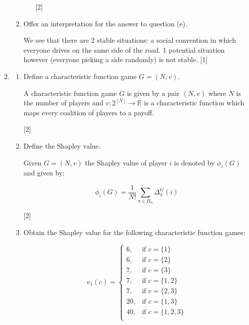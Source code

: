 \documentclass[12pt,a4paper]{article}
\begin{document}
\begin{enumerate}
\begin{enumerate}
\begin{itemize}
                \hfill{[2]}

                \end{itemize}

            \item Offer an interpretation for the answer to question (e).

                We see that there are 2 stable situations: a social convention in which everyone drives on the same side of the road.
                1 potential situation however (everyone picking a side randomly) is not stable.
                \hfill{[1]}
    \end{enumerate}

\newpage
\item


    \begin{enumerate}

        \item Define a characteristic function game \(G=(N,v)\).

        A characteristic function game \(G\) is given by a pair \((N,v)\) where \(N\) is the number of players and \(v:2^{[N]}\to\mathbb{R}\) is a characteristic function which maps every coalition of players to a payoff.

        \hfill{[2]}

        \item Define the Shapley value.

        Given \(G=(N,v)\) the Shapley value of player \(i\) is denoted by \(\phi_i(G)\) and given by:

        $$\phi_i(G)=\frac{1}{N!}\sum_{\pi\in\Pi_n}\Delta_\pi^G(i)$$

        \hfill{[2]}

        \item Obtain the Shapley value for the following characteristic function games:

            \[
                v_1(c) = \begin{cases}
                    6,& \text{if }c=\{1\}\\
                    6,& \text{if } c=\{2\}\\
                    7,& \text{if } c=\{3\}\\
                    7,& \text{if } c=\{1,2\}\\
                    7,& \text{if } c=\{2,3\}\\
                    20,& \text{if } c=\{1,3\}\\
                    40,& \text{if } c=\{1,2,3\}\\
                \end{cases}
            \]


\end{enumerate}
\end{enumerate}
\end{document}

